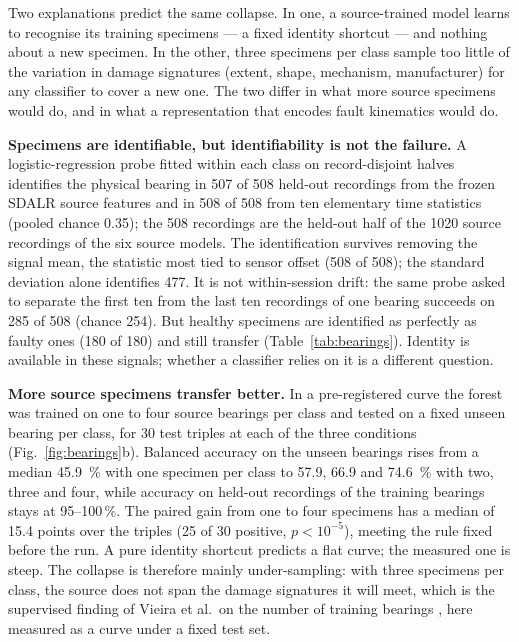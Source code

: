 Two explanations predict the same collapse. In one, a source-trained model learns to recognise its training specimens ---
a fixed identity shortcut --- and nothing about a new specimen. In the other, three specimens per class sample too little of
the variation in damage signatures (extent, shape, mechanism, manufacturer) for any classifier to cover a new one. The two
differ in what more source specimens would do, and in what a representation that encodes fault kinematics would do.

\textbf{Specimens are identifiable, but identifiability is not the failure.} A logistic-regression probe fitted within each
class on record-disjoint halves identifies the physical bearing in 507 of 508 held-out recordings from the frozen SDALR source
features and in 508 of 508 from ten elementary time statistics (pooled chance 0.35); the 508 recordings are the held-out half
of the 1020 source recordings of the six source models. The identification survives removing the signal mean, the statistic
most tied to sensor offset (508 of 508); the standard deviation alone identifies 477. It is not within-session drift: the
same probe asked to separate the first ten from the last ten recordings of one bearing succeeds on 285 of 508 (chance 254).
But healthy specimens are identified as perfectly as faulty ones (180 of 180) and still transfer (Table~\ref{tab:bearings}).
Identity is available in these signals; whether a classifier relies on it is a different question.

\textbf{More source specimens transfer better.} In a pre-registered curve the forest was trained on one to four source
bearings per class and tested on a fixed unseen bearing per class, for 30 test triples at each of the three conditions
(Fig.~\ref{fig:bearings}b). Balanced accuracy on the unseen bearings rises from a median \SI{45.9}{\percent} with one
specimen per class to 57.9, 66.9 and \SI{74.6}{\percent} with two, three and four, while accuracy on held-out recordings of
the training bearings stays at 95--100\,\%. The paired gain from one to four specimens has a median of 15.4 points over the
triples (25 of 30 positive, $p < 10^{-5}$), meeting the rule fixed before the run. A pure identity shortcut predicts a flat
curve; the measured one is steep. The collapse is therefore mainly under-sampling: with three specimens per class, the
source does not span the damage signatures it will meet, which is the supervised finding of Vieira et al.\ on the number of
training bearings \cite{vieira2026}, here measured as a curve under a fixed test set.

